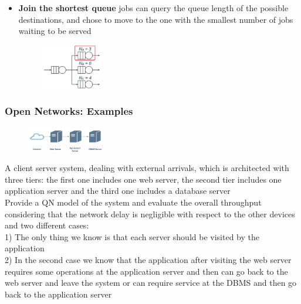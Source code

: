 \documentclass[10pt, oneside]{article}
\begin{document}
\begin{itemize}
\begin{itemize}
\begin{figure}[H]
\begin{center}
            \end{center}
        \end{figure}
    \item {\bf Join the shortest queue} jobs can query the queue length of the possible destinations, and chose
    to move to the one with the smallest number of jobs waiting to be served\begin{figure}[H]
        \begin{center}
            \includegraphics[width=0.25\textwidth]{img/img107.png}
            \end{center}
        \end{figure}
   
\end{itemize}
\end{itemize}\newpage
\subsubsection*{Open Networks: Examples}\begin{figure}[H]
    \begin{center}
        \includegraphics[width=0.3\textwidth]{img/img108.png}
        \end{center}
    \end{figure}A client server system, dealing with external arrivals, which is architected with three tiers: the first one includes one web server, the second tier includes one application server and the third one includes a database server\\
    Provide a QN model of the system and evaluate the overall throughput considering that the network delay is negligible with respect to the other devices and two different cases:\\
    1) The only thing we know is that each server should be visited by the application\\
    2) In the second case we know that the application after visiting the web server requires some operations at the application server and then can go back to the web server and leave the system or can require service at the DBMS and then go back to the application server
\end{document}
